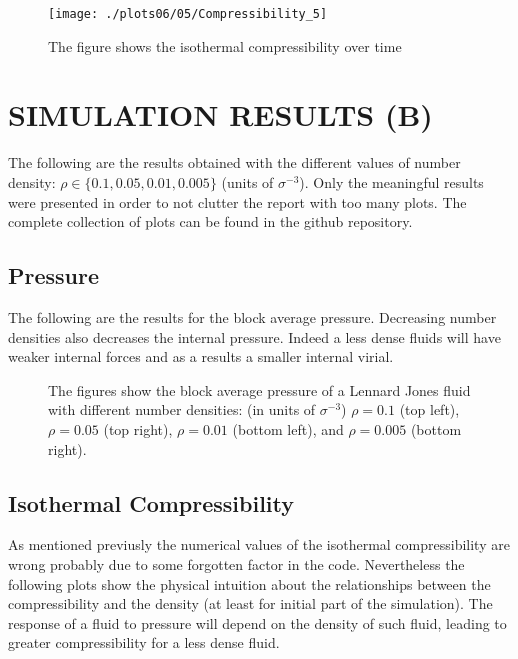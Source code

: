 \documentclass[aps,pra,reprint, onecolumn, rmp]{revtex4-2}
\begin{document}
\begin{figure}[h]
          \centering
          \texttt{[image: ./plots06/05/Compressibility\_5]}
          \caption{The figure shows the isothermal compressibility over time}
\end{figure}


\section{SIMULATION RESULTS (B)}
The following are the results obtained with the different values of number density: $\rho\in\{0.1, 0.05, 0.01, 0.005\}$ (units of $\sigma^{-3}$). Only the meaningful results were presented in order to not clutter the report with too many plots. The complete collection of plots can be found in the github repository.

\subsection{Pressure}
The following are the results for the block average pressure. Decreasing number densities also decreases the internal pressure. Indeed a less dense fluids will have weaker internal forces and as a results a smaller internal virial.

\begin{figure}[h]
    \centering
    
\end{figure}

\begin{figure}[h]
     \centering
     \caption{The figures show the block average pressure of a Lennard Jones fluid with different number densities: (in units of $\sigma^{-3}$) $\rho=0.1$ (top left), $\rho=0.05$ (top right), $\rho=0.01$ (bottom left), and $\rho=0.005$ (bottom right).}
    
\end{figure}

\subsection{Isothermal Compressibility}
As mentioned previusly the numerical values of the isothermal compressibility are wrong probably due to some forgotten factor in the code. Nevertheless the following plots show the physical intuition about the relationships between the compressibility and the density (at least for initial part of the simulation). The response of a fluid to pressure will depend on the density of such fluid, leading to greater compressibility for a less dense fluid.
\end{document}
